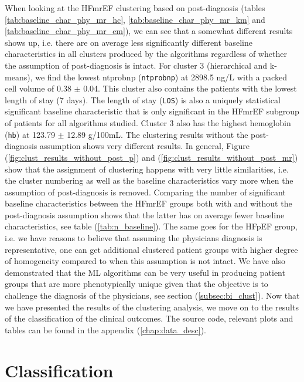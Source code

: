 \documentclass[../thesis.tex]{subfiles}
\begin{document}
\indent When looking at the HFmrEF clustering based on post-diagnosis (tables \ref{tab:baseline_char_phy_mr_hc}, \ref{tab:baseline_char_phy_mr_km} and \ref{tab:baseline_char_phy_mr_em}), we can see that a somewhat different results shows up, i.e. there are on average less significantly different baseline characteristics in all clusters produced by the algorithms regardless of whether the assumption of post-diagnosis is intact. For cluster 3 (hierarchical and k-means), we find the lowest ntprobnp (\texttt{ntprobnp}) at 2898.5 ng/L with a packed cell volume of 0.38 $\pm$ 0.04. This cluster also contains the patients with the lowest length of stay (7 days). The length of stay (\texttt{LOS}) is also a uniquely statistical significant baseline characteristic that is only significant in the HFmrEF subgroup of patients for all algorithms studied. Cluster 3 also has the highest hemoglobin (\texttt{hb}) at 123.79 $\pm$ 12.89 g/100mL. The clustering results without the post-diagnosis assumption shows very different results. In general, Figure (\ref{fig:clust_results_without_post_p}) and (\ref{fig:clust_results_without_post_mr}) show that the assignment of clustering happens with very little similarities, i.e. the cluster numbering as well as the baseline characteristics vary more when the assumption of post-diagnosis is removed. Comparing the number of significant baseline characteristics between the HFmrEF groups both with and without the post-diagnosis assumption shows that the latter has on average fewer baseline characteristics, see table (\ref{tab:n_baseline}). The same goes for the HFpEF group, i.e. we have reasons to believe that assuming the physicians diagnosis is representative, one can get additional clustered patient groups with higher degree of homogeneity compared to when this assumption is not intact. We have also demonstrated that the ML algorithms can be very useful in producing patient groups that are more phenotypically unique given that the objective is to challenge the diagnosis of the physicians, see section (\ref{subsec:bi_clust}). Now that we have presented the results of the clustering analysis, we move on to the results of the classification of the clinical outcomes. The source code, relevant plots and tables can be found in the appendix (\ref{chap:data_desc}).

\vspace*{-0,5cm}\section{Classification}
\end{document}
